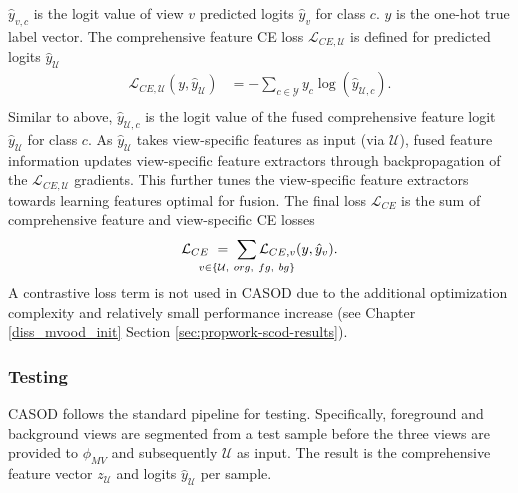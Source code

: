 $\hat{y}_{v,c}$ is the logit value of view $v$ predicted logits $\hat{y}_{v}$ for class $c$. $y$ is the one-hot true label vector. The comprehensive feature CE loss $\mathcal{L}_{CE,\mathcal{U}}$ is defined for predicted logits $\hat{y}_{\mathcal{U}}$
\begin{equation}
\begin{aligned}
    \mathcal{L}_{CE,\mathcal{U}}(y, \hat{y}_{\mathcal{U}}) & = -\sum_{c \in \mathcal{Y}} y_{c} \log(\hat{y}_{\mathcal{U},c}). \\
\end{aligned}
\end{equation}
Similar to above, $\hat{y}_{\mathcal{U},c}$ is the logit value of the fused comprehensive feature logit $\hat{y}_{\mathcal{U}}$ for class $c$. As $\hat{y}_{\mathcal{U}}$ takes view-specific features as input (via $\mathcal{U}$), fused feature information updates view-specific feature extractors through backpropagation of the $\mathcal{L}_{CE,\mathcal{U}}$ gradients. This further tunes the view-specific feature extractors towards learning features optimal for fusion. The final loss $\mathcal{L}_{CE}$ is the sum of comprehensive feature and view-specific CE losses
\begin{equation}
\begin{aligned}
    \mathcal{L}_{CE} ~= ~\smashoperator{\sum_{v \in \{\mathcal{U}, ~org, ~fg, ~bg\}}} \mathcal{L}_{CE,v} (y, \hat{y}_{v}).
\end{aligned}
\end{equation}
A contrastive loss term is not used in CASOD due to the additional optimization complexity and relatively small performance increase (see Chapter \ref{diss_mvood_init} Section \ref{sec:propwork-scod-results}).

\subsubsection{Testing}
CASOD follows the standard pipeline for testing. Specifically, foreground and background views are segmented from a test sample before the three views are provided to $\phi_{MV}$ and subsequently $\mathcal{U}$ as input. The result is the comprehensive feature vector $z_{\mathcal{U}}$ and logits $\hat{y}_{\mathcal{U}}$ per sample.

